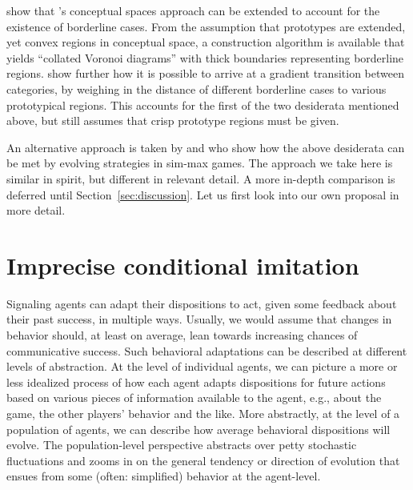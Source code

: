 \documentclass[fleqn,reqno,10pt]{article}
\begin{document}
\citet{DouvenDecock2011:Vagueness:-A-Co} show that
\citeauthor{Gardenfors2000:Conceptual-Spac}'s conceptual spaces
approach can be extended to account for the existence of borderline
cases. From the assumption that prototypes are extended, yet convex
regions in conceptual space, a construction algorithm is available
that yields ``collated Voronoi diagrams'' with thick boundaries
representing borderline
regions. \citet{DecockDouven2012:What-is-Graded-} show further how it
is possible to arrive at a gradient transition between categories, by
weighing in the distance of different borderline cases to various
prototypical regions. This accounts for the first of the two
desiderata mentioned above, but still assumes that crisp prototype
regions must be given.

An alternative approach is taken by \citet{FrankeJager2010:Vagueness-Signa} and
\citet{OConnor2013:The-Evolution-o} who show how the above desiderata can be met by evolving
strategies in sim-max games. The approach we take here is similar in spirit, but different in
relevant detail. A more in-depth comparison is deferred until Section~\ref{sec:discussion}. Let
us first look into our own proposal in more detail.



\section{Imprecise conditional imitation}
\label{sec:repl-diff-dynam}

Signaling agents can adapt their dispositions to act, given some feedback about their past
success, in multiple ways. Usually, we would assume that changes in behavior should, at least
on average, lean towards increasing chances of communicative success. Such behavioral
adaptations can be described at different levels of abstraction. At the level of individual
agents, we can picture a more or less idealized process of how each agent adapts dispositions
for future actions based on various pieces of information available to the agent, e.g., about
the game, the other players' behavior and the like. More abstractly, at the level of a
population of agents, we can describe how average behavioral dispositions will evolve. The
population-level perspective abstracts over petty stochastic fluctuations and zooms in on the
general tendency or direction of evolution that ensues from some (often: simplified) behavior
at the agent-level.
\end{document}
